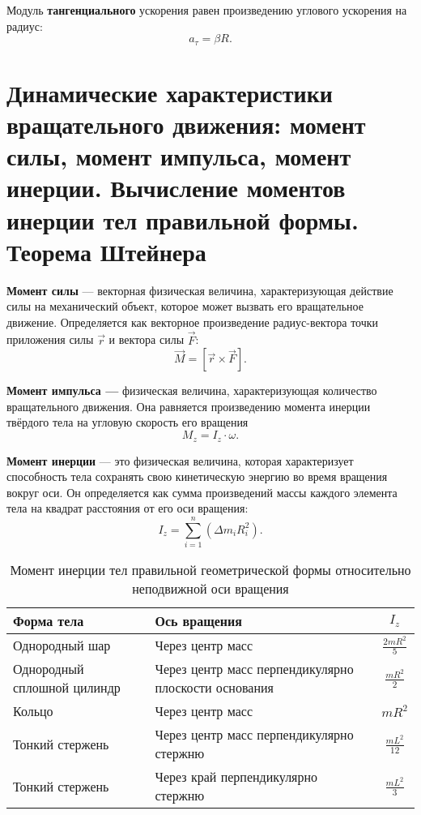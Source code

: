 \documentclass[10pt]{scrbook}
\begin{document}
Модуль \textbf{тангенциального} ускорения равен произведению углового ускорения
на радиус: \[
	a_\tau = \beta R
	.\]

\section[седьмой вопрос]{Динамические характеристики вращательного движения:
  момент силы, момент импульса, момент инерции. Вычисление моментов инерции тел
  правильной формы. Теорема Штейнера}

\textbf{Момент силы} --- векторная физическая величина, характеризующая
действие силы на механический объект, которое может вызвать его вращательное
движение. Определяется как векторное произведение радиус-вектора точки
приложения силы $\vec {r}$ и вектора силы $\vec {F}$: \[
	\vec{M} = [\vec{r} \times \vec{F}]
	.\]

\textbf{Момент импульса ---} физическая величина, характеризующая количество
вращательного движения. Она равняется произведению момента инерции твёрдого
тела на угловую скорость его вращения \[
	M_z = I_z \cdot \omega
	.\]

\textbf{Момент инерции} --- это физическая величина, которая характеризует
способность тела сохранять свою кинетическую энергию во время вращения вокруг
оси. Он определяется как сумма произведений массы каждого элемента тела на
квадрат расстояния от его оси вращения: \[
	I_z = \sum_{i=1}^{n} (\Delta m_i R_i^2)%
	.\]

\begin{table}[htpb]
	\centering
	\caption{Момент инерции тел правильной геометрической формы относительно неподвижной оси вращения}

	\begin{tabular}{p{} p{} c}
		\toprule
		Форма тела                  & Ось вращения                                         & \( I_z \)               \\
		\midrule
		Однородный шар              & Через центр масс                                     & \( \frac{2 m R^2}{5} \) \\
		Однородный сплошной цилиндр & Через центр масс перпендикулярно плоскости основания & \( \frac{m R^2}{2} \)   \\
		Кольцо                      & Через центр масс                                     & \( m R^2 \)             \\
		Тонкий стержень             & Через центр масс перпендикулярно стержню             & \( \frac{m L^2}{12} \)  \\
		Тонкий стержень             & Через край перпендикулярно стержню                   & \( \frac{m L^2}{3} \)   \\
		\bottomrule
	\end{tabular}
\end{table}
\end{document}
